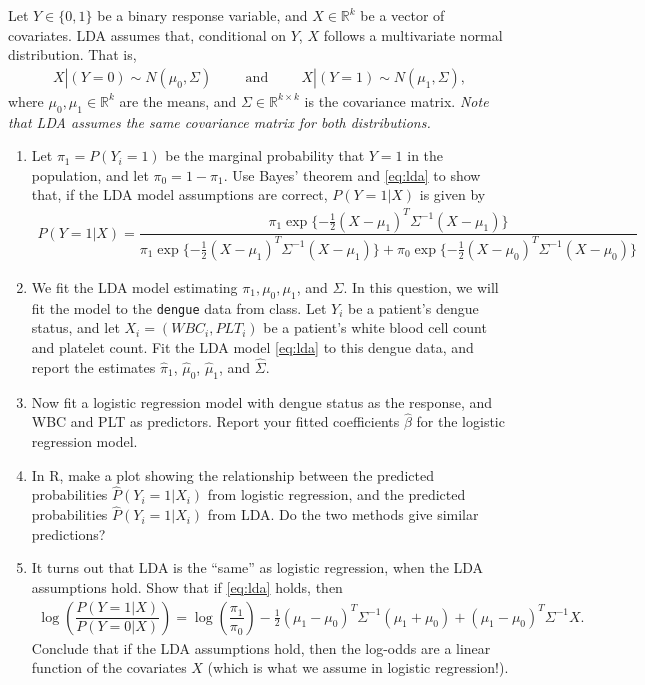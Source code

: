 \documentclass[11pt]{article}
\begin{document}
Let $Y \in \{0,1\}$ be a binary response variable, and $X \in \mathbb{R}^{k}$ be a vector of covariates. LDA assumes that, conditional on $Y$, $X$ follows a multivariate normal distribution. That is,
\begin{align}
\label{eq:lda}
X|(Y = 0) \sim N(\mu_0, \Sigma) \hspace{1cm} \text{and} \hspace{1cm} X|(Y = 1) \sim N(\mu_1, \Sigma),
\end{align}
where $\mu_0, \mu_1 \in \mathbb{R}^k$ are the means, and $\Sigma \in \mathbb{R}^{k \times k}$ is the covariance matrix. \textit{Note that LDA assumes the same covariance matrix for both distributions.}

\begin{enumerate}
\item Let $\pi_1 = P(Y_i = 1)$ be the marginal probability that $Y = 1$ in the population, and let $\pi_0 = 1 - \pi_1$. Use Bayes' theorem and \eqref{eq:lda} to show that, if the LDA model assumptions are correct, $P(Y = 1 | X)$ is given by
\begin{align*}
P(Y = 1 | X) = \dfrac{\pi_1 \exp \{-\frac{1}{2} (X - \mu_1)^T \Sigma^{-1} (X - \mu_1) \}}{\pi_1 \exp \{-\frac{1}{2} (X - \mu_1)^T \Sigma^{-1} (X - \mu_1) \} + \pi_0 \exp \{-\frac{1}{2} (X - \mu_0)^T \Sigma^{-1} (X - \mu_0) \}}
\end{align*}

\item We fit the LDA model estimating $\pi_1, \mu_0, \mu_1$, and $\Sigma$. In this question, we will fit the model to the \texttt{dengue} data from class. Let $Y_i$ be a patient's dengue status, and let $X_i = (WBC_i, PLT_i)$ be a patient's white blood cell count and platelet count. Fit the LDA model \eqref{eq:lda} to this dengue data, and report the estimates $\widehat{\pi}_1$, $\widehat{\mu}_0$, $\widehat{\mu}_1$, and $\widehat{\Sigma}$.

\item Now fit a logistic regression model with dengue status as the response, and WBC and PLT as predictors. Report your fitted coefficients $\widehat{\beta}$ for the logistic regression model.

\item In R, make a plot showing the relationship between the predicted probabilities $\widehat{P}(Y_i = 1 | X_i)$ from logistic regression, and the predicted probabilities $\widehat{P}(Y_i = 1 | X_i)$ from LDA. Do the two methods give similar predictions?

\item It turns out that LDA is the ``same'' as logistic regression, when the LDA assumptions hold. Show that if \eqref{eq:lda} holds, then 
\begin{align*}
\log \left( \dfrac{P(Y = 1 | X)}{P(Y = 0 | X)} \right) = \log \left( \dfrac{\pi_1}{\pi_0} \right) - \frac{1}{2} (\mu_1 - \mu_0)^T \Sigma^{-1} (\mu_1 + \mu_0) + (\mu_1 - \mu_0)^T \Sigma^{-1} X.
\end{align*}
Conclude that if the LDA assumptions hold, then the log-odds are a linear function of the covariates $X$ (which is what we assume in logistic regression!).
\end{enumerate}
\end{document}
